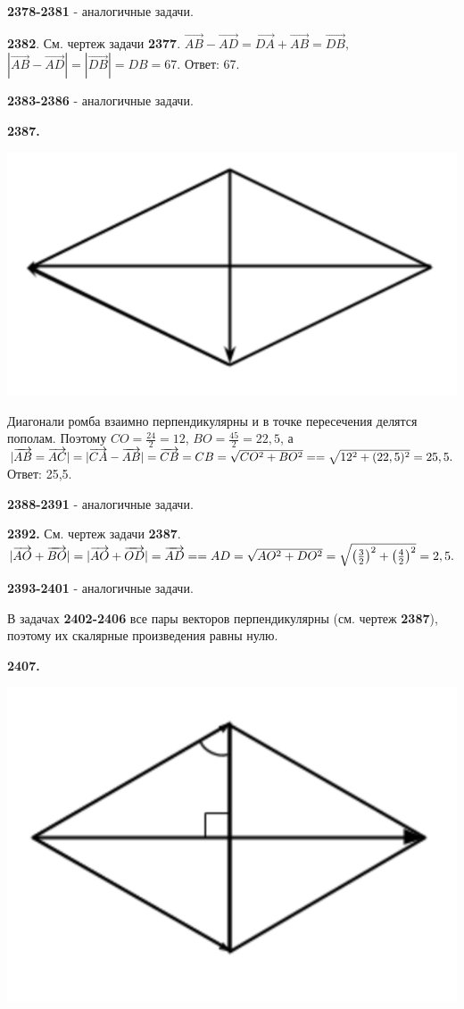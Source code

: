 \textbf{2378-2381} - аналогичные задачи.

\textbf{2382}. См. чертеж задачи \textbf{2377}. $\overrightarrow{AB} - \overrightarrow{AD}=\overrightarrow{DA}+\overrightarrow{AB}=\overrightarrow{DB},$ $|\overrightarrow{AB}-\overrightarrow{AD}|=|\overrightarrow{DB}|=DB=67.$ \newline \null \hspace*{\fill} Ответ: 67.  

\textbf{2383-2386} - аналогичные задачи.

\textbf{2387.}

{\centering \includegraphics[width=0.5\linewidth]{Geometry/Content/58.png}
	
}

Диагонали ромба взаимно перпендикулярны и в точке пересечения делятся пополам. Поэтому $CO=\frac{24}{2}=12$, $BO=\frac{45}{2}=22,5$, а $|\overrightarrow{AB}=\overrightarrow{AC}|=|\overrightarrow{CA}-\overrightarrow{AB}|=\overrightarrow{CB}=CB=\sqrt{CO^2+BO^2}=\linebreak=\sqrt{12^2+(22,5)^2}=25,5.$ \newline \null \hspace*{\fill} Ответ: 25,5.

\textbf{2388-2391} - аналогичные задачи.

\textbf{2392.}  См. чертеж задачи  \textbf{2387}. $|\overrightarrow{AO}+\overrightarrow{BO}|=|\overrightarrow{AO}+\overrightarrow{OD}|=\overrightarrow{AD}=\linebreak=AD=\sqrt{AO^2+DO^2}=\sqrt{\left( \frac{3}{2} \right)^2 + \left( \frac{4}{2} \right)^2}=2,5.$ 

\textbf{2393-2401} - аналогичные задачи.

В задачах \textbf{2402-2406} все пары векторов перпендикулярны (см. чертеж \textbf{2387}), поэтому их скалярные произведения равны нулю.

\textbf{2407.}

{\centering \includegraphics[width=0.5\linewidth]{Geometry/Content/59.png}
	
}

